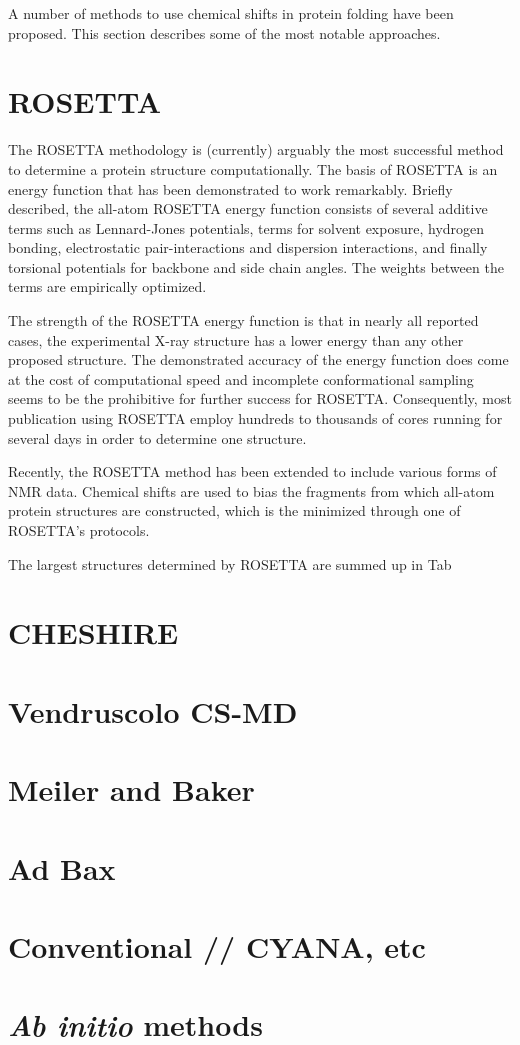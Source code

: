 A number of methods to use chemical shifts in protein folding have been proposed. This section describes some of the most notable approaches.

\section{ROSETTA}

The ROSETTA methodology is (currently) arguably the most successful method to determine a protein structure computationally.
The basis of ROSETTA is an energy function that has been demonstrated to work remarkably. Briefly described, the all-atom ROSETTA energy function consists of several additive terms such as Lennard-Jones potentials, terms for solvent exposure, hydrogen bonding, electrostatic pair-interactions and dispersion interactions, and finally torsional potentials for backbone and side chain angles.
The weights between the terms are empirically optimized.

The strength of the ROSETTA energy function is that in nearly all reported cases, the experimental X-ray structure has a lower energy than any other proposed structure. The demonstrated accuracy of the energy function does come at the cost of computational speed and incomplete conformational sampling seems to be the prohibitive for further success for ROSETTA. Consequently, most publication using ROSETTA employ hundreds to thousands of cores running for several days in order to determine one structure.

Recently, the ROSETTA method has been extended to include various forms of NMR data. Chemical shifts are used to bias the fragments from which all-atom protein structures are constructed, which is the minimized through one of ROSETTA's protocols.

The largest structures determined by ROSETTA are summed up in Tab 

\section{CHESHIRE}

\section{Vendruscolo CS-MD}

\section{Meiler and Baker}

\section{Ad Bax}

\section{Conventional // CYANA, etc}

\section{\textit{Ab initio} methods}



